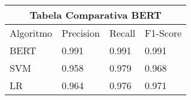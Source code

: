 \begin{table}
 \label{table:comparativobert}
\begin{tabular}{ |p{3cm}||p{3cm}|p{3cm}|p{3cm}|  }
 \hline
 \multicolumn{4}{|c|}{Tabela Comparativa BERT} \\
 \hline
 Algoritmo & Precision & Recall & F1-Score\\
 \hline
 BERT & 0.991 & 0.991 & 0.991 \\
 SVM & 0.958 & 0.979 & 0.968 \\
 LR & 0.964 & 0.976 & 0.971  \\
 \hline
\end{tabular}
\end{table}



